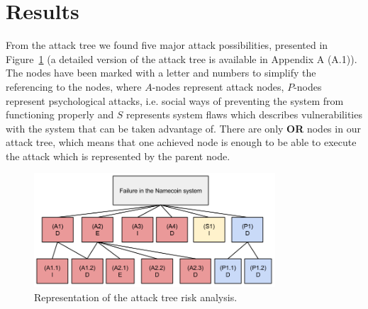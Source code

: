 \documentclass[frame, english]{idamasterthesis}
\begin{document}
\section{Results}
From the attack tree we found five major attack possibilities, presented in Figure~\ref{fig:smallattacktree} (a detailed version of the attack tree is available in Appendix A (A.1)). The nodes have been marked with a letter and numbers to simplify the referencing to the nodes, where $A$-nodes represent attack nodes, $P$-nodes represent psychological attacks, i.e. social ways of preventing the system from functioning properly and $S$ represents system flaws which describes vulnerabilities with the system that can be taken advantage of. There are only \textbf{OR} nodes in our attack tree, which means that one achieved node is enough to be able to execute the attack which is represented by the parent node.

\begin{figure}[h!]      %
    \centering
    \includegraphics[width=90mm]{Pics/smallattacktree.png}
    \caption{Representation of the attack tree risk analysis.}
    \label{fig:smallattacktree}
\end{figure}
\end{document}
